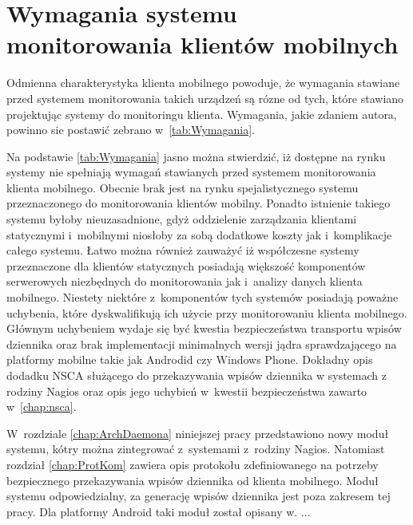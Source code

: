 \section[Wymagania][Wymagania systemu monitorowania klientów
mobilnych]{Wymagania systemu monitorowania klientów mobilnych}

Odmienna charakterystyka klienta mobilnego powoduje, że wymagania
stawiane przed systemem monitorowania takich urządzeń są rózne od
tych, które stawiano projektując systemy do monitoringu
klienta. Wymagania, jakie zdaniem autora, powinno sie postawić zebrano
w~\ref{tab:Wymagania}.



Na podstawie \ref{tab:Wymagania} jasno można stwierdzić, iż dostępne
na rynku systemy nie spełniają wymagań stawianych przed systemem
monitorowania klienta mobilnego. Obecnie brak jest na rynku
spejalistycznego systemu przeznaczonego do monitorowania klientów
mobilny. Ponadto istnienie takiego systemu byłoby nieuzasadnione, gdyż
oddzielenie zarządzania klientami statycznymi i~mobilnymi niosłoby za
sobą dodatkowe koszty jak i~komplikacje całego systemu. Łatwo można
również zauważyć iż współczesne systemy przeznaczone dla klientów
statycznych posiadają większość komponentów serwerowych niezbędnych do
monitorowania jak i~analizy danych klienta mobilnego. Niestety
niektóre z~komponentów tych systemów posiadają poważne uchybenia,
które dyskwalifikują ich użycie przy monitorowaniu klienta
mobilnego. Głównym uchybeniem wydaje się być kwestia bezpieczeństwa
transportu wpisów dziennika oraz brak implementacji minimalnych wersji
jądra sprawdzającego na platformy mobilne takie jak Androdid czy
Windows Phone. Dokładny opis dodadku NSCA służącego do przekazywania
wpisów dziennika w systemach z rodziny Nagios oraz opis jego uchybień
w~kwestii bezpieczeństwa zawarto w~\ref{chap:nsca}.



W~rozdziale \ref{chap:ArchDaemona} niniejszej pracy przedstawiono nowy moduł systemu,
kótry można zintegrować z~systemami z~rodziny Nagios. Natomiast
rozdział \ref{chap:ProtKom} zawiera opis protokołu zdefiniowanego na potrzeby
bezpiecznego przekazywania wpisów dziennika od klienta
mobilnego. Moduł systemu odpowiedzialny, za generację wpisów dziennika
jest poza zakresem tej pracy. Dla platformy Android taki moduł został
opisany w. ...

